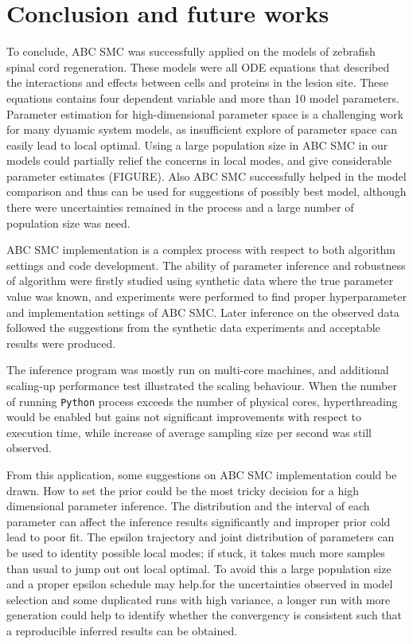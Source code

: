 \chapter{Conclusion and future works}




 To conclude, ABC SMC was successfully applied on the models of zebrafish spinal cord regeneration. These models were all ODE equations that described the interactions and effects between cells and proteins in the lesion site. These equations contains four dependent variable and more than 10 model parameters.  Parameter estimation for high-dimensional parameter space is a challenging work for many dynamic system models, as insufficient explore of parameter space can easily lead to local optimal. Using a large population size in ABC SMC in our models could partially relief the concerns in local modes, and give considerable parameter estimates (FIGURE). Also ABC SMC successfully helped in the model comparison and thus can be used for suggestions of possibly best model, although there were uncertainties remained in the process and a large number of population size was need.

 ABC SMC implementation is a complex process with respect to both algorithm settings and code development. The ability of parameter inference and robustness of algorithm were firstly studied using synthetic data where the true parameter value was known, and experiments were performed to find proper hyperparameter and implementation settings of ABC SMC. Later inference on the observed data followed the suggestions from the synthetic data experiments and acceptable results were produced.

 The inference program was mostly run on multi-core machines, and additional scaling-up performance test illustrated the scaling behaviour. When the number of running \verb|Python| process exceeds the number of physical cores, hyperthreading would be enabled but gains not significant improvements with respect to execution time, while increase of average sampling size per second was still observed.


 From this application, some suggestions on ABC SMC implementation could be drawn. How to set the prior could be the most tricky decision for a high dimensional parameter inference. The distribution and the interval of each parameter can affect the inference results significantly and improper prior cold lead to poor fit. The epsilon trajectory and joint distribution of parameters can be used to identity possible local modes; if stuck, it takes much more samples than usual to jump out out local optimal. To avoid this a large population size and a proper epsilon schedule may help.for the uncertainties observed in model selection and some duplicated runs with high variance, a longer run with more generation could help to identify whether the convergency is consistent such that a reproducible inferred results can be obtained.

